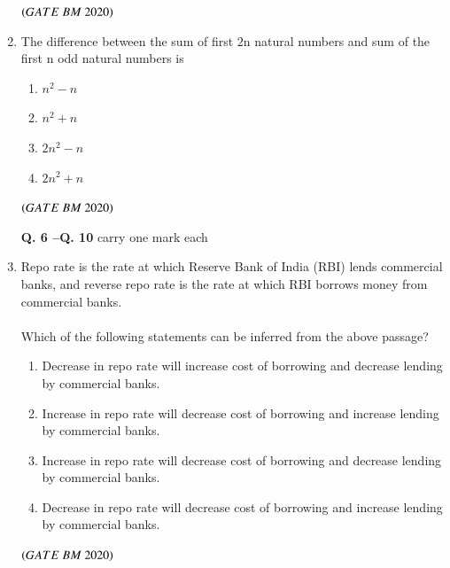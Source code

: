 \documentclass[journal,12pt,onecolumn]{IEEEtran}
\theoremstyle{remark}
\begin{document}
\begin{enumerate}
\begin{enumerate}
 \end{enumerate}
   \hfill $\left(GATE\ BM\ 2020\right)$
   

 \item The difference between the sum of first $2$n natural numbers and sum of the first n odd natural numbers is\underline {\hspace{2cm}}
 
 \begin{enumerate}
     \item \hspace{0.5cm}$n^2-n$
     \item \hspace{0.5cm}$n^2+n$
     \item \hspace{0.5cm}$2n^2-n$
     \item \hspace{0.5cm}$2n^2+n$
     
 \end{enumerate}
\hfill $\left(GATE\ BM\ 2020\right)$

  \noindent \textbf{Q. 6 --Q.  \textbf{10}} carry one mark each
  
\item Repo rate is the rate at which Reserve Bank of India (RBI) lends commercial banks, and reverse repo rate is the rate at which RBI borrows money from commercial banks.\\
\\Which of the following statements can be inferred from the above passage?
\begin{enumerate}
    \item \hspace{0.5cm}Decrease in repo rate will increase cost of borrowing and decrease lending by commercial banks.
    \item \hspace{0.5cm}Increase in repo rate will decrease cost of borrowing and increase lending by commercial banks.
    \item \hspace{0.5cm}Increase in repo rate will decrease cost of borrowing and decrease lending by commercial banks.
    \item \hspace{0.5cm}Decrease in repo rate will decrease cost of borrowing and increase lending by commercial banks.\\
    \end{enumerate}
\hfill $\left(GATE\ BM\ 2020\right)$


\end{enumerate}
\end{document}
